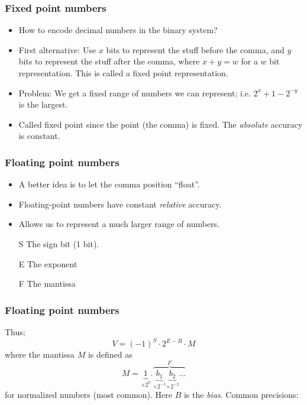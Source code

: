 \begin{frame}
  \frametitle{Fixed point numbers}
  \begin{itemize}
  \item How to encode decimal numbers in the binary system?
  \item First alternative: Use $x$ bits to represent the stuff before the
    comma, and $y$ bits to represent the stuff after the comma, where $x+y = w$
    for a $w$ bit representation. This is called a fixed point representation.
  \item Problem: We get a fixed range of numbers we can represent; i.e.
    $2^x + 1 - 2^{-y}$ is the largest.
  \item Called fixed point since the point (the comma) is fixed. The
    \emph{absolute} accuracy is constant.
  \end{itemize}
\end{frame}

\begin{frame}
  \frametitle{Floating point numbers}
  \begin{itemize}
  \item A better idea is to let the comma position ``float''.
  \item Floating-point numbers have constant \emph{relative} accuracy.
  \item Allows us to represent a much larger range of numbers.
  \end{itemize}
  \begin{center}
    
  \end{center}
  \begin{itemize}
    \item[S] The sign bit (1 bit).
    \item[E] The exponent
    \item[F] The mantissa
  \end{itemize}
\end{frame}

\begin{frame}
  \frametitle{Floating point numbers}
  Thus;
  \[
    V = (-1)^S \cdot 2^{E-B}\cdot M
  \]
  where the mantissa $M$ is defined as
  \[
    M = \underbrace{1}_{\times2^0} .
    \overbrace{\underbrace{b_1}_{\times2^{-1}}
      \underbrace{b_2}_{\times2^{-2}}\ldots}^{F}
  \]
  for normalized numbers (most common). Here $B$ is the \emph{bias}. Common
  precisions:
  \begin{center}
    
  \end{center}
\end{frame}

